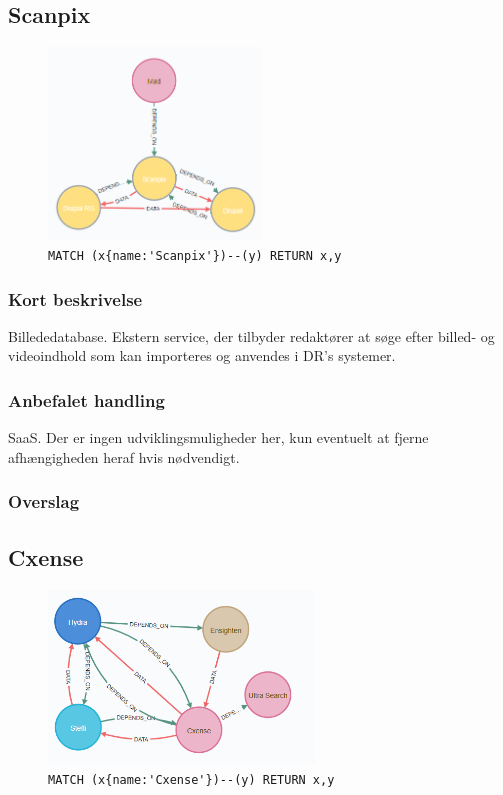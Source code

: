 \documentclass{article}
\begin{document}
\subsection{Scanpix}
\begin{figure}[H]
\includegraphics[width=160pt]{Scanpix.PNG}
\cprotect\caption{\verb|MATCH (x{name:'Scanpix'})--(y) RETURN x,y|}
\end{figure}
\subsubsection*{Kort beskrivelse}
Billededatabase. Ekstern service, der tilbyder redaktører at søge efter billed- og videoindhold som kan importeres og anvendes i DR's systemer.
\subsubsection*{Anbefalet handling}
SaaS. Der er ingen udviklingsmuligheder her, kun eventuelt at fjerne afhængigheden heraf hvis nødvendigt.
\subsubsection*{Overslag}


\subsection{Cxense}
\begin{figure}[H]
\includegraphics[width=200pt]{Cxense.PNG}
\cprotect\caption{\verb|MATCH (x{name:'Cxense'})--(y) RETURN x,y|}
\end{figure}
\end{document}
